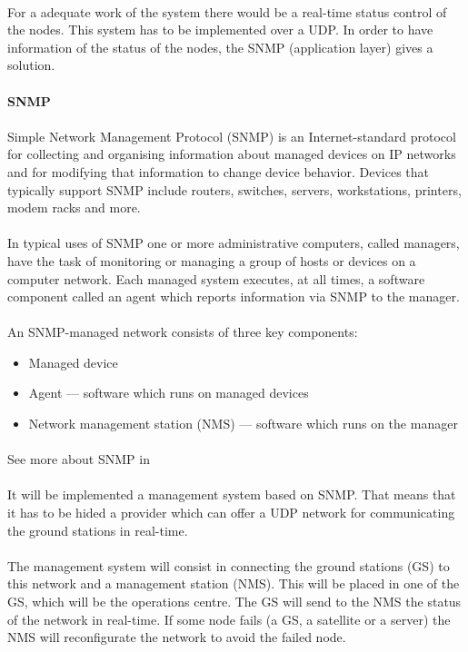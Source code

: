 \paragraph{}
For a adequate work of the system there would be a real-time status control of the nodes. This system has to be implemented over a UDP. In order to have information of the status of the nodes, the SNMP (application layer) gives a solution.

\paragraph{} \textbf{SNMP}
\paragraph{} 
Simple Network Management Protocol (SNMP) is an Internet-standard protocol for collecting and organising information about managed devices on IP networks and for modifying that information to change device behavior. Devices that typically support SNMP include routers, switches, servers, workstations, printers, modem racks and more.
\paragraph{}
In typical uses of SNMP one or more administrative computers, called managers, have the task of monitoring or managing a group of hosts or devices on a computer network. Each managed system executes, at all times, a software component called an agent which reports information via SNMP to the manager.
\paragraph{}
An SNMP-managed network consists of three key components:
\begin{itemize}
\item Managed device
\item Agent — software which runs on managed devices
\item Network management station (NMS) — software which runs on the manager
\end{itemize}
\paragraph{}
See more about SNMP in \cite{SNMP}


\paragraph{}
It will be implemented a management system based on SNMP. That means that it has to be hided a provider which can offer a UDP network for communicating the ground stations in real-time. 
\paragraph{}
The management system will consist in connecting the ground stations (GS) to this network and a management station (NMS). This will be placed in one of the GS, which will be the operations centre. The GS will send to the NMS the status of the network in real-time. If some node fails (a GS, a satellite or a server) the NMS will reconfigurate the network to avoid the failed node. 